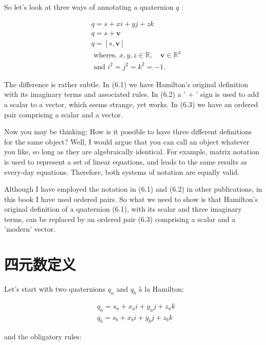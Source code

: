 So let's look at three ways of annotating a quaternion $q$ :

$$
    \begin{aligned}
         & q=s+x i+y j+z k                                                               \\
         & q=s+\mathbf{v}                                                                \\
         & q=[s, \mathbf{v}]                                                             \\
         & \text { wheres, } x, y, z \in \mathbb{R}, \quad \mathbf{v} \in \mathbb{R}^{3} \\
         & \text { and } i^{2}=j^{2}=k^{2}=-1 .
    \end{aligned}
$$

The difference is rather subtle. In (6.1) we have Hamilton's original definition with its imaginary terms and associated rules. In (6.2) a ' + ' sign is used to add a scalar to a vector, which seems strange, yet works. In (6.3) we have an ordered pair comprising a scalar and a vector.

Now you may be thinking: How is it possible to have three different definitions for the same object? Well, I would argue that you can call an object whatever you like, so long as they are algebraically identical. For example, matrix notation is used to represent a set of linear equations, and leads to the same results as every-day equations. Therefore, both systems of notation are equally valid.

Although I have employed the notation in (6.1) and (6.2) in other publications, in this book I have used ordered pairs. So what we need to show is that Hamilton's original definition of a quaternion (6.1), with its scalar and three imaginary terms, can be replaced by an ordered pair (6.3) comprising a scalar and a 'modern' vector.

\section{四元数定义}
Let's start with two quaternions $q_{a}$ and $q_{b}$ à la Hamilton:

$$
    \begin{aligned}
         & q_{a}=s_{a}+x_{a} i+y_{a} j+z_{a} k \\
         & q_{b}=s_{b}+x_{b} i+y_{b} j+z_{b} k
    \end{aligned}
$$

and the obligatory rules:

